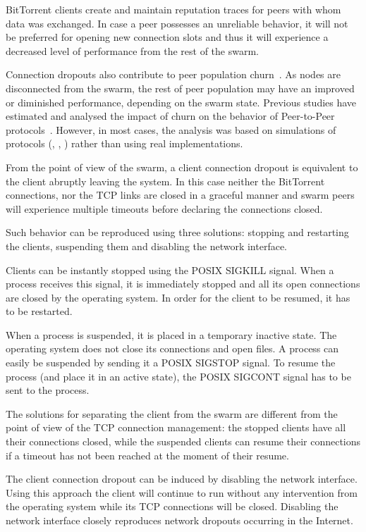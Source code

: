 BitTorrent clients create and maintain reputation traces for peers with
whom data was exchanged. In case a peer possesses an unreliable behavior, it
will not be preferred for opening new connection slots and thus it will
experience a decreased level of performance from the rest of the swarm.

Connection dropouts also contribute to peer population
churn~\cite{understanding-churn}. As nodes are disconnected from the swarm, the
rest of peer population may have an improved or diminished performance,
depending on the swarm state. Previous studies have estimated and analysed the
impact of churn on the behavior of Peer-to-Peer
protocols~\cite{Binzenhofer:2007:ECS:1769187.1769257}. However, in most cases,
the analysis was based on simulations of protocols (\cite{Luo2010},
\cite{Katsaros2009}, \cite{Ou:2010:PEK:1749614.1749649}) rather than using
real implementations.

From the point of view of the swarm, a client connection dropout is equivalent
to the client abruptly leaving the system. In this case neither the
BitTorrent connections, nor the TCP links are closed in a graceful manner and
swarm peers will experience multiple timeouts before declaring the connections
closed.

Such behavior can be reproduced using three solutions: stopping and restarting
the clients, suspending them and disabling the network interface.

Clients can be instantly stopped using the POSIX SIGKILL signal. When a
process receives this signal, it is immediately stopped and all its open
connections are closed by the operating system. In order for the client to be
resumed, it has to be restarted.

When a process is suspended, it is placed in a temporary inactive state. The
operating system does not close its connections and open files. A process
can easily be suspended by sending it a POSIX SIGSTOP signal. To resume the
process (and place it in an active state), the POSIX SIGCONT signal has to be
sent to the process.

The solutions for separating the client from the swarm are different from the
point of view of the TCP connection management: the stopped clients have all
their connections closed, while the suspended clients can resume their
connections if a timeout has not been reached at the moment of their resume.

The client connection dropout can be induced by disabling the network
interface. Using this approach the client will continue to run without any
intervention from the operating system while its TCP connections will be
closed. Disabling the network interface closely reproduces network dropouts
occurring in the Internet.

